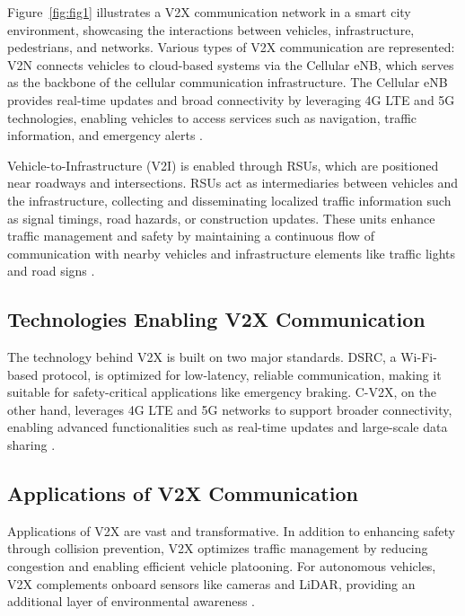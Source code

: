 Figure~\ref{fig:fig1} illustrates a V2X communication network in a smart city environment, showcasing the interactions between
 vehicles, infrastructure, pedestrians, and networks. Various types of V2X communication are represented:
  \ac{V2N} connects vehicles to cloud-based systems via the Cellular \ac{eNB},
   which serves as the backbone of the cellular communication infrastructure. The Cellular eNB provides real-time updates
    and broad connectivity by leveraging 4G LTE and 5G technologies, enabling vehicles to access services such as navigation, 
    traffic information, and emergency alerts \cite{cite-key}. 

Vehicle-to-Infrastructure (V2I) is enabled through \ac{RSUs}, which are positioned near roadways 
and intersections. RSUs act as intermediaries between vehicles and the infrastructure, collecting and disseminating
 localized traffic information such as signal timings, road hazards, or construction updates. These units enhance 
 traffic management and safety by maintaining a continuous flow of communication with nearby vehicles and infrastructure 
 elements like traffic lights and road signs \cite{10806826}. 
    

 \subsection{Technologies Enabling V2X Communication}

 The technology behind V2X is built on two major standards. \ac{DSRC},
 a Wi-Fi-based protocol, is optimized for low-latency, reliable communication, making it suitable for 
 safety-critical applications like emergency braking. \ac{C-V2X}, on the other hand, leverages 
 4G LTE and 5G networks to support broader connectivity, enabling advanced functionalities such as real-time updates and 
 large-scale data sharing \cite{cite-key1}. 

 \subsection{Applications of V2X Communication}

Applications of V2X are vast and transformative. In addition to enhancing safety through 
collision prevention, V2X optimizes traffic management by reducing congestion and enabling 
efficient vehicle platooning. For autonomous vehicles, V2X complements onboard sensors like 
cameras and LiDAR, providing an additional layer of environmental awareness \cite{Sidorenko2024}. 

